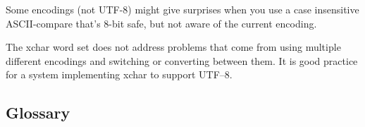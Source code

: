 Some encodings (not UTF-8) might give surprises when you use a case
insensitive ASCII-compare that's 8-bit safe, but not aware of the
current encoding.

The xchar word set does not address problems that come from using
multiple different encodings and switching or converting between them.
It is good practice for a system implementing xchar to support UTF--8.

\setcounter{subsection}{5}
\subsection{Glossary} %


\endinput
